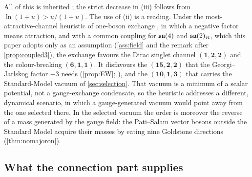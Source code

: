 All of this is inherited \cite{NambuJonaLasinio61,Slansky}; the strict decrease in (iii) follows from $\ln(1+u)>u/(1+u)$. The use of (ii) is a reading.
Under the most-attractive-channel heuristic of one-boson exchange \cite{RabyDimopoulosSusskind80}, in which a negative factor means attraction, and
with a common coupling for $\mathfrak{su}(4)$ and $\mathfrak{su}(2)_R$, which this paper adopts only as an assumption (\cref{ass:field} and the remark after
\cref{prop:coupled3}), the exchange favours the Dirac singlet channel $(\mathbf1,\mathbf2,\mathbf2)$ and the colour-breaking $(\mathbf6,\mathbf1,\mathbf1)$.
It disfavours the $(\mathbf{15},\mathbf2,\mathbf2)$ that the Georgi--Jarlskog factor $-3$ needs (\cref{prop:EW}; \cite{GeorgiJarlskog79}), and the
$(\mathbf{10},\mathbf1,\mathbf3)$ that carries the Standard-Model vacuum of \cref{sec:selection}. That vacuum is a minimum of a scalar potential, not a
gauge-exchange condensate, so the heuristic addresses a different, dynamical scenario, in which a gauge-generated vacuum would point away from the
one selected there. In the selected vacuum the order is moreover the reverse of a mass generated by the gauge field: the Pati--Salam vector bosons
outside the Standard Model acquire their masses by eating nine Goldstone directions (\cref{thm:nomajoron}).

\subsection{What the connection part supplies}
\label{sec:bf-synthesis}

